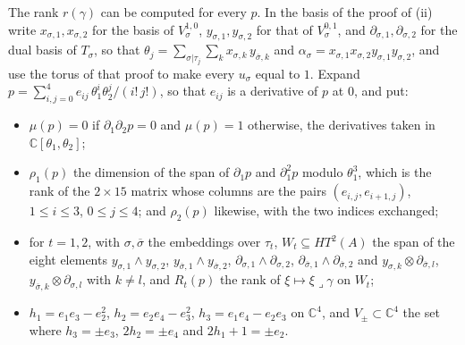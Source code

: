 \documentclass[11pt,reqno]{amsart}
\theoremstyle{plain}
\theoremstyle{definition}
\theoremstyle{remark}
\newcommand{\CC}{\mathbb{C}}
\newcommand{\bbar}[1]{\overline{#1}}
\begin{document}
The rank $r(\gamma)$ can be computed for every $p$. In the basis of the
proof of (ii) write $x_{\sigma,1},x_{\sigma,2}$ for
the basis of $V_{\sigma}^{1,0}$, $y_{\sigma,1},y_{\sigma,2}$ for that of
$V_{\sigma}^{0,1}$, and $\partial_{\sigma,1},\partial_{\sigma,2}$ for the dual
basis of $T_{\sigma}$, so that $\theta_{j}=\sum_{\sigma|\tau_{j}}\sum_{k}
x_{\sigma,k}\,y_{\bbar\sigma,k}$ and $\alpha_{\sigma}=x_{\sigma,1}x_{\sigma,2}
y_{\sigma,1}y_{\sigma,2}$, and use the torus of that proof to make every
$u_{\sigma}$ equal to $1$. Expand
$p=\sum_{i,j=0}^{4}e_{ij}\,\theta_{1}^{i}\theta_{2}^{j}/(i!\,j!)$, so that
$e_{ij}$ is a derivative of $p$ at $0$, and put:
\begin{itemize}[leftmargin=1.6em,itemsep=1pt]
\item $\mu(p)=0$ if $\partial_{1}\partial_{2}p=0$ and $\mu(p)=1$ otherwise,
  the derivatives taken in $\CC[\theta_{1},\theta_{2}]$;
\item $\rho_{1}(p)$ the dimension of the span of $\partial_{1}p$ and
  $\partial_{1}^{2}p$ modulo $\theta_{1}^{3}$, which is the rank of the
  $2\times15$ matrix whose columns are the pairs $(e_{i,j},e_{i+1,j})$,
  $1\le i\le3$, $0\le j\le4$; and $\rho_{2}(p)$ likewise, with the two indices
  exchanged;
\item for $t=1,2$, with $\sigma,\bbar\sigma$ the embeddings over $\tau_{t}$,
  $W_{t}\subseteq HT^{2}(A)$ the span of the eight elements
  $y_{\sigma,1}\wedge y_{\sigma,2}$, $y_{\bbar\sigma,1}\wedge
  y_{\bbar\sigma,2}$, $\partial_{\sigma,1}\wedge\partial_{\sigma,2}$,
  $\partial_{\bbar\sigma,1}\wedge\partial_{\bbar\sigma,2}$ and
  $y_{\sigma,k}\otimes\partial_{\bbar\sigma,l}$,
  $y_{\bbar\sigma,k}\otimes\partial_{\sigma,l}$ with $k\ne l$, and $R_{t}(p)$
  the rank of $\xi\mapsto\xi\lrcorner\gamma$ on $W_{t}$;
\item $h_{1}=e_{1}e_{3}-e_{2}^{2}$, $h_{2}=e_{2}e_{4}-e_{3}^{2}$,
  $h_{3}=e_{1}e_{4}-e_{2}e_{3}$ on $\CC^{4}$, and $V_{\pm}\subset\CC^{4}$ the
  set where $h_{3}=\pm e_{3}$, $2h_{2}=\pm e_{4}$ and $2h_{1}+1=\pm e_{2}$.
\end{itemize}
\end{document}
